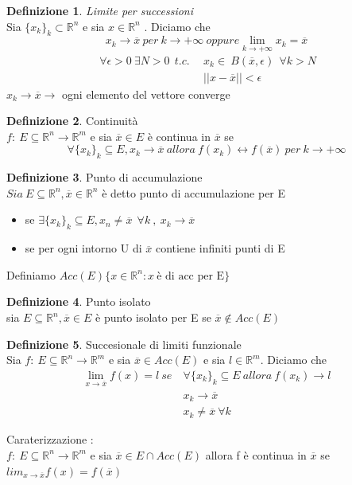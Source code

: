 \documentclass{article}
\theoremstyle{definition}
\newtheorem*{definizione}{Definizione}
\newcommand{\R}{\mathbb{R}}
\newcommand{\Rn}{\R^n}
\newcommand{\xb}{\overline{x}}
\begin{document}
	\begin{definizione}
		\textit{Limite per successioni}\\
		Sia $\{x_k\}_k \subset \Rn $ e sia $x\in \Rn$ . Diciamo che 
		$$x_k\rightarrow \overline{x} \ per \ k \rightarrow +\infty \ oppure \lim_{k\rightarrow +\infty}x_k=\overline{x}$$
		\begin{align*}
			\ \forall \epsilon > 0 \ \exists N > 0 \ \ t.c. \ \ & x_k \in \ B (\overline{x},\epsilon) \ \  \forall k > N \\
			&||x-\overline{x}|| < \epsilon
		\end{align*}
		$x_k \rightarrow \overline{x} \rightarrow$ ogni elemento del vettore converge
	\end{definizione}
	\begin{definizione}
		Continuità \\
		$f:\ E\subseteq \Rn \rightarrow \R^m $ e sia $ \overline{x}\in E$ è continua in $\overline{x}$ se 
		$$\forall \{x_k\}_k \subseteq E , x_k \rightarrow \overline{x} \ allora \ f(x_k)\leftrightarrow f(\overline{x}) \ per \ k\rightarrow +\infty $$
	\end{definizione}
	\begin{definizione}
		Punto di accumulazione \\
		$Sia\ E \subseteq \Rn , \overline{x} \in \Rn$ è detto punto di accumulazione per E \begin{itemize}
			\item 
			se $\exists \{x_k\}_k \subseteq E , x_n \neq \overline{x} \ \ \forall k \ ,\ x_k \rightarrow \overline{x}  $
			\item se per ogni intorno U di $\overline{x}$ contiene infiniti punti di E
		\end{itemize}
		
	\end{definizione}
	Definiamo $Acc(E)\{ x\in \Rn : x \ \text{è di acc per E}\}$
	\begin{definizione}
		Punto isolato \\
		sia $E \subseteq \Rn , \overline{x} \in E$ è punto isolato per E se $\overline{x} \notin Acc(E)$ 
	\end{definizione}
	\begin{definizione}
		Succesionale di limiti funzionale \\
		Sia $f:\ E\subseteq \Rn \rightarrow \R^m $ e sia $ \overline{x}\in Acc(E)$ e sia $l \in \R^m$. Diciamo che 
		\begin{align*}
			\lim_{x\rightarrow \xb}f(x)=l \ se \ &\forall \{x_k\}_k \subseteq E \ allora \ f(x_k)\rightarrow l \\
			& x_k \rightarrow \xb \\
			& x_k \neq \xb \ \forall k 
		\end{align*}
	\end{definizione}
	Caraterizzazione : \\$f:\ E\subseteq \Rn \rightarrow \R^m $ e sia $ \overline{x}\in  E \cap Acc(E)$ allora f è continua in $\xb$ se $lim_{x\rightarrow \xb} f(x)=f(\xb)$
\end{document}
